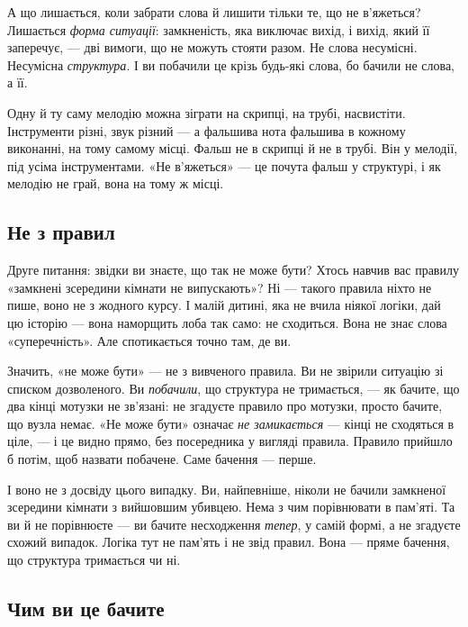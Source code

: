 \documentclass[12pt, a4paper, openany]{book}
\begin{document}
А що лишається, коли забрати слова й лишити тільки те, що не в'яжеться? Лишається \emph{форма ситуації}: замкненість, яка виключає вихід, і вихід, який її заперечує, --- дві вимоги, що не можуть стояти разом. Не слова несумісні. Несумісна \emph{структура}. І ви побачили це крізь будь-які слова, бо бачили не слова, а її.

\begin{analogybox}
Одну й ту саму мелодію можна зіграти на скрипці, на трубі, насвистіти. Інструменти різні, звук різний --- а фальшива нота фальшива в кожному виконанні, на тому самому місці. Фальш не в скрипці й не в трубі. Він у мелодії, під усіма інструментами. «Не в'яжеться» --- це почута фальш у структурі, і як мелодію не грай, вона на тому ж місці.
\end{analogybox}

\subsection{Не з правил}

Друге питання: звідки ви знаєте, що так не може бути? Хтось навчив вас правилу «замкнені зсередини кімнати не випускають»? Ні --- такого правила ніхто не пише, воно не з жодного курсу. І малій дитині, яка не вчила ніякої логіки, дай цю історію --- вона наморщить лоба так само: не сходиться. Вона не знає слова «суперечність». Але спотикається точно там, де ви.

Значить, «не може бути» --- не з вивченого правила. Ви не звірили ситуацію зі списком дозволеного. Ви \emph{побачили}, що структура не тримається, --- як бачите, що два кінці мотузки не зв'язані: не згадуєте правило про мотузки, просто бачите, що вузла немає. «Не може бути» означає \emph{не замикається} --- кінці не сходяться в ціле, --- і це видно прямо, без посередника у вигляді правила. Правило прийшло б потім, щоб назвати побачене. Саме бачення --- перше.

І воно не з досвіду цього випадку. Ви, найпевніше, ніколи не бачили замкненої зсередини кімнати з вийшовшим убивцею. Нема з чим порівнювати в пам'яті. Та ви й не порівнюєте --- ви бачите несходження \emph{тепер}, у самій формі, а не згадуєте схожий випадок. Логіка тут не пам'ять і не звід правил. Вона --- пряме бачення, що структура тримається чи ні.

\subsection{Чим ви це бачите}
\end{document}
